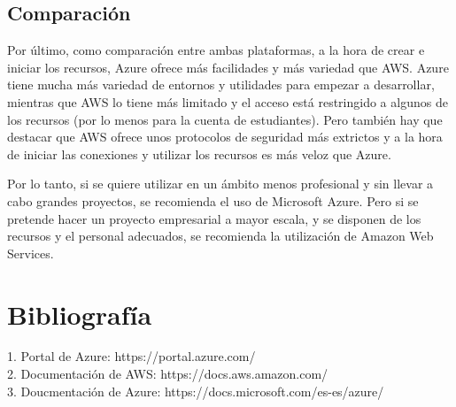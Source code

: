 \documentclass[english,runningheads,a4paper]{llncs}[2018/03/10]
\begin{document}
\subsection{Comparación}

Por último, como comparación entre ambas plataformas, a la hora de crear e iniciar
los recursos, Azure ofrece más facilidades y más variedad que AWS. Azure tiene
mucha más variedad de entornos y utilidades para empezar a desarrollar, mientras
que AWS lo tiene más limitado y el acceso está restringido a algunos de los
recursos (por lo menos para la cuenta de estudiantes). Pero también hay que
destacar que AWS ofrece unos protocolos de seguridad más extrictos y a la hora de
iniciar las conexiones y utilizar los recursos es más veloz que Azure.

Por lo tanto, si se quiere utilizar en un ámbito menos profesional y sin llevar a
cabo grandes proyectos, se recomienda el uso de Microsoft Azure. Pero si se
pretende hacer un proyecto empresarial a mayor escala, y se disponen de los
recursos y el personal adecuados, se recomienda la utilización de Amazon Web
Services.

\newpage



\section*{Bibliografía}

1. Portal de Azure: https://portal.azure.com/ \\
2. Documentación de AWS: https://docs.aws.amazon.com/ \\
3. Doucmentación de Azure: https://docs.microsoft.com/es-es/azure/
\newpage
\printbibliography
\end{document}
